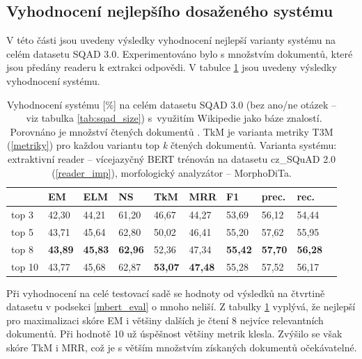 \subsection{Vyhodnocení nejlepšího dosaženého systému}
\label{best_eval}
V této části jsou uvedeny výsledky vyhodnocení nejlepší varianty systému na celém datasetu SQAD 3.0. Experimentováno bylo s množstvím dokumentů, které jsou předány readeru k extrakci odpovědi. V tabulce \ref{tab:final_evaluation} jsou uvedeny výsledky vyhodnocení systému.
\begin{table}[H]
    \centering
    \begin{tabular}{|l||l|l|l|l|l|l|l|l|l|}
        \hline
          & \textbf{EM}   & ELM       & NS        & TkM       & MRR       & \textbf{F1}   & prec.         & rec. \\ \hline\hline
            top 3    & 42,30         & 44,21     & 61,20     & 46,67     & 44,27     & 53,69         & 56,12         & 54,44    \\ \hline
            top 5    & 43,71         & 45,64     & 62,80     & 50,02     & 46,41     & 55,20         & 57,62         & 55,95    \\ \hline
            top 8   & \textbf{43,89}         & \textbf{45,83}     & \textbf{62,96}     & 52,36     & 47,34     & \textbf{55,42}         & \textbf{57,70}         & \textbf{56,28}    \\ \hline
            top 10   & 43,77         & 45,68     & 62,87     & \textbf{53,07}     & \textbf{47,48}     & 55,28         & 57,52        & 56,17    \\ \hline
    \end{tabular}
    \caption{Vyhodnocení systému [\%] na celém datasetu SQAD 3.0 (bez ano/ne otázek --~viz tabulka \ref{tab:sqad_size}) s~využitím Wikipedie jako báze znalostí. Porovnáno je množství čtených dokumentů . TkM je varianta metriky T3M (\ref{metriky}) pro každou variantu top \emph{k} čtených dokumentů. Varianta systému: extraktivní reader -- vícejazyčný BERT trénován na datasetu cz\_SQuAD 2.0 (\ref{reader_imp}), morfologický analyzátor -- MorphoDiTa.}
    \label{tab:final_evaluation}
\end{table}
Při vyhodnocení na celé testovací sadě se hodnoty od výsledků na čtvrtině datasetu v podsekci \ref{mbert_eval} o mnoho neliší. Z tabulky \ref{tab:final_evaluation} vyplývá, že nejlepší pro maximalizaci skóre EM i většiny dalších je čtení 8 nejvíce relevantních dokumentů. Při hodnotě 10 už úspěšnost většiny metrik klesla. Zvýšilo se však skóre TkM i MRR, což je s větším množstvím získaných dokumentů očekávatelné.

